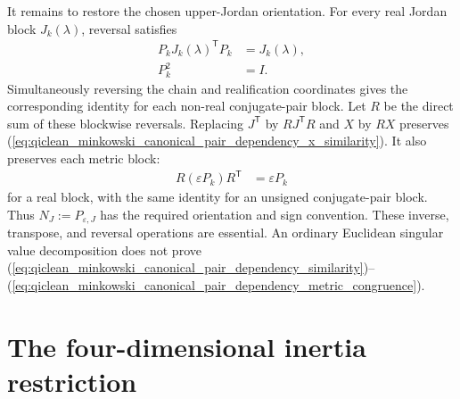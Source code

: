 \documentclass{article}
\begin{document}
It remains to restore the chosen upper-Jordan orientation. For every real
Jordan block $J_k(\lambda)$, reversal satisfies
\begin{align}
    P_kJ_k(\lambda)^{\mathsf T}P_k
        &=J_k(\lambda),
    \label{eq:qiclean_minkowski_canonical_pair_dependency_real_block_reversal}\\
    P_k^2
        &=I.
    \label{eq:qiclean_minkowski_canonical_pair_dependency_reversal_involution}
\end{align}
Simultaneously reversing the chain and realification coordinates gives the
corresponding identity for each non-real conjugate-pair block. Let $R$ be the
direct sum of these blockwise reversals. Replacing $J^{\mathsf T}$ by
$RJ^{\mathsf T}R$ and $X$ by $RX$ preserves
(\ref{eq:qiclean_minkowski_canonical_pair_dependency_x_similarity}). It also
preserves each metric block:
\begin{align}
    R(\varepsilon P_k)R^{\mathsf T}
        &=\varepsilon P_k
    \label{eq:qiclean_minkowski_canonical_pair_dependency_signed_metric_reversal}
\end{align}
for a real block, with the same identity for an unsigned conjugate-pair block.
Thus $N_J:=P_{\varepsilon,J}$ has the required orientation and sign
convention. These inverse, transpose, and reversal operations are essential.
An ordinary Euclidean singular value decomposition does not prove
(\ref{eq:qiclean_minkowski_canonical_pair_dependency_similarity})--%
(\ref{eq:qiclean_minkowski_canonical_pair_dependency_metric_congruence}).

\section{The four-dimensional inertia restriction}
\end{document}
